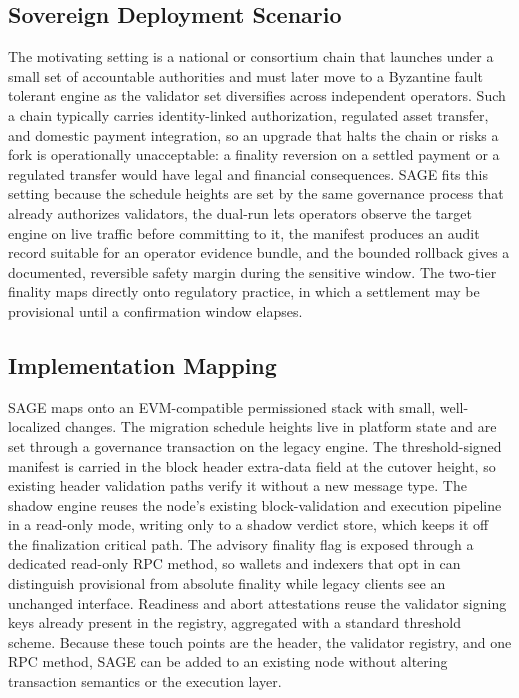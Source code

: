 \documentclass[journal]{IEEEtran}
\theoremstyle{remark}
\begin{document}
\subsection{Sovereign Deployment Scenario}
The motivating setting is a national or consortium chain that launches under a small set of
accountable authorities and must later move to a Byzantine fault tolerant engine as the
validator set diversifies across independent operators. Such a chain typically carries
identity-linked authorization, regulated asset transfer, and domestic payment integration, so an
upgrade that halts the chain or risks a fork is operationally unacceptable: a finality reversion
on a settled payment or a regulated transfer would have legal and financial consequences. SAGE
fits this setting because the schedule heights are set by the same governance process that
already authorizes validators, the dual-run lets operators observe the target engine on live
traffic before committing to it, the manifest produces an audit record suitable for an operator
evidence bundle, and the bounded rollback gives a documented, reversible safety margin during the
sensitive window. The two-tier finality maps directly onto regulatory practice, in which a
settlement may be provisional until a confirmation window elapses.

\subsection{Implementation Mapping}
SAGE maps onto an EVM-compatible permissioned stack with small, well-localized changes. The
migration schedule heights live in platform state and are set through a governance transaction
on the legacy engine. The threshold-signed manifest is carried in the block header extra-data
field at the cutover height, so existing header validation paths verify it without a new message
type. The shadow engine reuses the node's existing block-validation and execution pipeline in a
read-only mode, writing only to a shadow verdict store, which keeps it off the finalization
critical path. The advisory finality flag is exposed through a dedicated read-only RPC method, so
wallets and indexers that opt in can distinguish provisional from absolute finality while legacy
clients see an unchanged interface. Readiness and abort attestations reuse the validator signing
keys already present in the registry, aggregated with a standard threshold scheme. Because these
touch points are the header, the validator registry, and one RPC method, SAGE can be added to an
existing node without altering transaction semantics or the execution layer.
\end{document}
